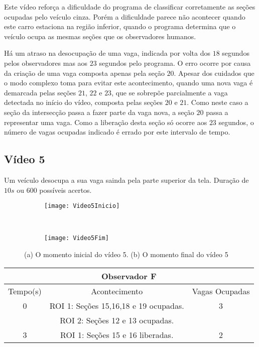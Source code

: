 Este vídeo reforça a dificuldade do programa de classificar corretamente as seções ocupadas pelo veículo cinza. Porém a dificuldade parece não acontecer quando este carro estaciona na região inferior, quando o programa determina que o veículo ocupa as mesmas seções que os observadores humanos.

Há um atraso na desocupação de uma vaga, indicada por volta dos $18$ segundos pelos observadores mas aos $23$ segundos pelo programa. O erro ocorre por causa da criação de uma vaga composta apenas pela seção $20$. Apesar dos cuidados que o modo complexo toma para evitar este acontecimento, quando uma nova vaga é demarcada pelas seções $21$, $22$ e $23$, que se sobrepõe parcialmente a vaga detectada no início do vídeo, composta pelas seções $20$ e $21$. Como neste caso a seção da intersecção passa a fazer parte da vaga nova, a seção $20$ passa a representar uma vaga. Como a liberação desta seção só ocorre aos $23$ segundos, o número de vagas ocupadas indicado é errado por este intervalo de tempo.


\subsection{Vídeo 5}

Um veículo desocupa a sua vaga sainda pela parte superior da tela. Duração de $10s$ ou $600$ possíveis acertos.

\begin{figure}[!h]
\centering
\begin{subfigure}{.5\textwidth}
\centering
\texttt{[image: Video5Inicio]}
\caption{}
\end{subfigure}\
\begin{subfigure}{.5\textwidth}
\centering
\texttt{[image: Video5Fim]}
\caption{}
\end{subfigure}
\centering
\caption{(a) O momento inicial do vídeo 5. (b) O momento final do vídeo 5}%
\label{}%
\end{figure}

\begin{center}
\begin{tabular}{|c||c||c|}
\hline
\multicolumn{3}{|c|}{Observador F}  \\ \hline \hline
Tempo(s) & Acontecimento & Vagas Ocupadas\\ \hline
0 & ROI 1: Seções 15,16,18 e 19 ocupadas. & 3 \\
 & ROI 2: Seções 12 e 13 ocupadas. &  \\ \hline
3 & ROI 1: Seções 15 e 16 liberadas. & 2 \\
\hline
\end{tabular}
\end{center}

